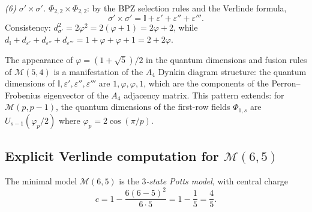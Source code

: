 \begin{computation}
\emph{(6) $\sigma' \times \sigma'$.}
$\Phi_{2,2}\times\Phi_{2,2}$: by the BPZ selection rules and the Verlinde formula,
\begin{equation}\label{eq:fusion-5-4-sigp-sigp}
\sigma' \times \sigma' = \mathbb{I} + \varepsilon' + \varepsilon'' + \varepsilon'''.
\end{equation}
Consistency: $d_{\sigma'}^2 = 2\varphi^2 = 2(\varphi+1) = 2\varphi + 2$, while
$d_{\mathbb{I}} + d_{\varepsilon'} + d_{\varepsilon''} + d_{\varepsilon'''} = 1 + \varphi + \varphi + 1 = 2 + 2\varphi$.
\end{computation}

\begin{remark}\label{rem:golden-ratio-5-4}
The appearance of $\varphi = (1+\sqrt{5})/2$ in the quantum dimensions and
fusion rules of $\mathcal{M}(5,4)$ is a manifestation of the $A_4$ Dynkin
diagram structure: the quantum dimensions of
$\mathbb{I}, \varepsilon', \varepsilon'', \varepsilon'''$ are
$1, \varphi, \varphi, 1$, which are the components of the Perron--Frobenius
eigenvector of the $A_4$ adjacency matrix. This pattern extends: for
$\mathcal{M}(p,p{-}1)$, the quantum dimensions of the first-row fields
$\Phi_{1,s}$ are $U_{s-1}(\varphi_p/2)$ where $\varphi_p = 2\cos(\pi/p)$.
\end{remark}

\subsection{\texorpdfstring{Explicit Verlinde computation for $\mathcal{M}(6,5)$}{Explicit Verlinde computation for M(6,5)}}
\label{subsec:verlinde-6-5}

The minimal model $\mathcal{M}(6,5)$ is the \emph{$3$-state Potts model},
with central charge
\begin{equation}\label{eq:c-6-5}
c = 1 - \frac{6(6-5)^2}{6 \cdot 5} = 1 - \frac{1}{5} = \frac{4}{5}.
\end{equation}

